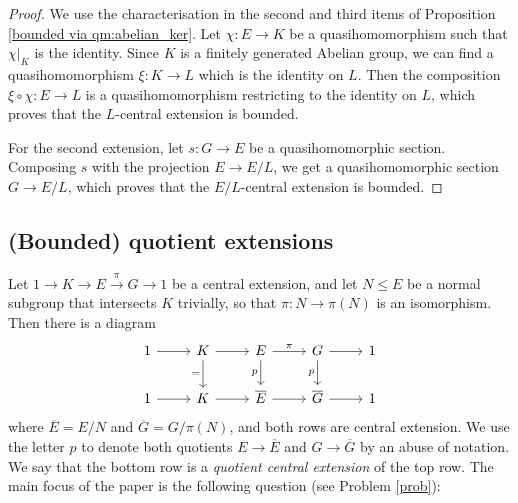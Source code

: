 \documentclass[svgnames]{amsart}
\theoremstyle{plain}
\theoremstyle{definition}
\begin{document}
\begin{proof}
    We use the characterisation in the second and third items of Proposition \ref{bounded via qm:abelian_ker}. Let $\chi \colon E \to K$ be a quasihomomorphism such that $\chi|_K$ is the identity. Since $K$ is a finitely generated Abelian group, we can find a quasihomomorphism $\xi\colon K\to L$ which is the identity on $L$. Then the composition $\xi \circ \chi\colon E\to L$ is a quasihomomorphism restricting to the identity on $L$, which proves that the $L$-central extension is bounded. 
    
    For the second extension, let $s\colon G\to E$ be a quasihomomorphic section. Composing $s$ with the projection $E \to E/L$, we get a quasihomomorphic section $G \to E/L$, which proves that the $E/L$-central extension is bounded.
\end{proof}

\subsection{(Bounded) quotient extensions}

Let $1 \to K \to E \xrightarrow{\pi} G \to 1$ be a central extension, and let $N \le E$ be a normal subgroup that intersects $K$ trivially, so that $\pi \colon N \to \pi(N)$ is an isomorphism. Then there is a diagram
\begin{equation}
\label{diagram qce}
\begin{tikzcd}
	1 & K & E & G & 1 \\
	1 & K & {\overline{E}} & {\overline{G}} & 1
	\arrow[from=1-1, to=1-2]
	\arrow[from=1-2, to=1-3]
	\arrow["{=}"', from=1-2, to=2-2]
	\arrow["\pi", from=1-3, to=1-4]
	\arrow["p"', from=1-3, to=2-3]
	\arrow[from=1-4, to=1-5]
	\arrow["p"', from=1-4, to=2-4]
	\arrow[from=2-1, to=2-2]
	\arrow[from=2-2, to=2-3]
	\arrow[from=2-3, to=2-4]
	\arrow[from=2-4, to=2-5]
\end{tikzcd}
\end{equation}
where $\overline{E} = E/N$ and $\overline{G} = G/\pi(N)$, and both rows are central extension. We use the letter $p$ to denote both quotients $E \to \overline{E}$ and $G \to \overline{G}$ by an abuse of notation. We say that the bottom row is a \emph{quotient central extension} of the top row. The main focus of the paper is the following question (see Problem \ref{prob}):
\end{document}
